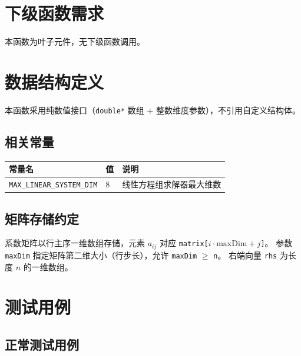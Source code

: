 \documentclass[a4paper,10pt]{article}
\begin{document}
\section{下级函数需求}

本函数为叶子元件，无下级函数调用。

\section{数据结构定义}

本函数采用纯数值接口（\texttt{double*} 数组 + 整数维度参数），不引用自定义结构体。

\subsection{相关常量}

\begin{longtable}{|L{5cm}|C{1.5cm}|L{8.5cm}|}
\hline
\textbf{常量名} & \textbf{值} & \textbf{说明} \\
\hline
\texttt{MAX\_LINEAR\_SYSTEM\_DIM} & 8 & 线性方程组求解器最大维数 \\
\hline
\end{longtable}

\subsection{矩阵存储约定}

系数矩阵以行主序一维数组存储，元素 $a_{ij}$ 对应 \texttt{matrix[$i \cdot \text{maxDim} + j$]}。
参数 \texttt{maxDim} 指定矩阵第二维大小（行步长），允许 \texttt{maxDim} $\geq$ \texttt{n}。
右端向量 \texttt{rhs} 为长度 $n$ 的一维数组。

\section{测试用例}

\subsection{正常测试用例}
\end{document}
